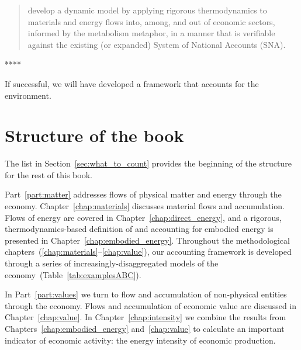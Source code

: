 \begin{quote}
\begin{normalsize}
develop a dynamic model 
by applying rigorous thermodynamics 
to materials and energy flows into, among, and out of economic sectors,
informed by the metabolism metaphor,
in a manner that is verifiable against 
the existing (or expanded) System of National Accounts (SNA).
\end{normalsize}
\end{quote}

\noindent{}

****

\noindent{}If successful, we will have developed a framework 
that accounts for the environment. 


\section{Structure of the book}
\label{sec:structure}

The list in Section~\ref{sec:what_to_count} 
provides the beginning of the structure for the rest of this book.

Part~\ref{part:matter} addresses flows of physical matter and energy
through the economy.
Chapter~\ref{chap:materials} discusses material flows and accumulation.
Flows of energy are covered in Chapter~\ref{chap:direct_energy}, 
and a rigorous, thermodynamics-based definition of and accounting for 
embodied energy is presented in Chapter~\ref{chap:embodied_energy}.
Throughout the methodological chapters~(\ref{chap:materials}--\ref{chap:value}),
our accounting framework is developed
through a series of increasingly-disaggregated
models of the economy~(Table~\ref{tab:examplesABC}).

In Part~\ref{part:values} we turn to flow and accumulation of 
non-physical entities through the economy. 
Flows and accumulation of economic value are discussed in Chapter~\ref{chap:value}.
In Chapter~\ref{chap:intensity} we combine the results from 
Chapters~\ref{chap:embodied_energy} and~\ref{chap:value} to
calculate an important indicator of economic activity:
the energy intensity of economic production.

